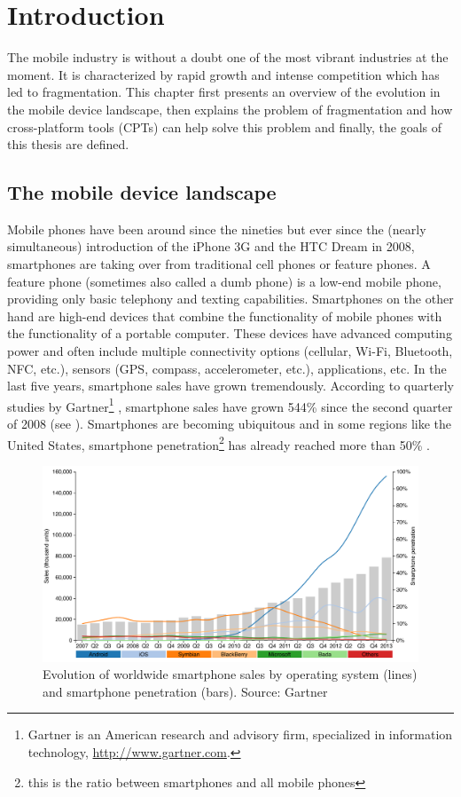 \chapter{Introduction}
\label{cha:intro}

The mobile industry is without a doubt one of the most vibrant industries at the moment. It is characterized by rapid growth and intense competition which has led to fragmentation. This chapter first presents an overview of the evolution in the mobile device landscape, then explains the problem of fragmentation and how cross-platform tools (CPTs) can help solve this problem and finally, the goals of this thesis are defined.

\section{The mobile device landscape}

Mobile phones have been around since the nineties but ever since the (nearly simultaneous) introduction of the iPhone 3G and the HTC Dream in 2008, smartphones are taking over from traditional cell phones or feature phones. A feature phone (sometimes also called a dumb phone) is a low-end mobile phone, providing only basic telephony and texting capabilities. Smartphones on the other hand are high-end devices that combine the functionality of mobile phones with the functionality of a portable computer. These devices have advanced computing power and often include multiple connectivity options (cellular, Wi-Fi, Bluetooth, NFC, etc.), sensors (GPS, compass, accelerometer, etc.), applications, etc. In the last five years, smartphone sales have grown tremendously. According to quarterly studies by Gartner\footnote{Gartner is an American research and advisory firm, specialized in information technology, \url{http://www.gartner.com}.} \citeGartner, smartphone sales have grown 544\% since the second quarter of 2008 (see ). Smartphones are becoming ubiquitous and in some regions like the United States, smartphone penetration\footnote{this is the ratio between smartphones and all mobile phones} has already reached more than 50\% \cite{Nielsen:2012}. 

\begin{figure}[h]
    \centering
    \includegraphics[width=\textwidth]{figs/smartphone_sales.pdf}
    	\caption{Evolution of worldwide smartphone sales by operating system (lines) and smartphone penetration (bars). Source: Gartner \citeGartner}
    	\label{fig:smartphone-sales}
\end{figure}

